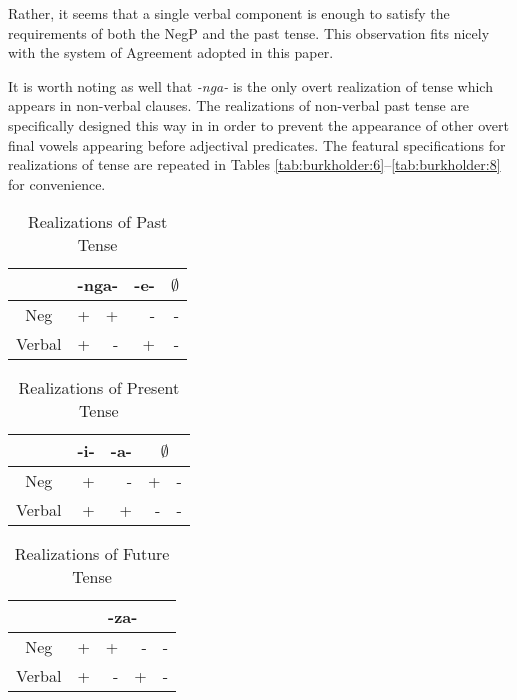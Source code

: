 \documentclass[output=paper]{langsci/langscibook}
\newcommand{\nga}[0]{\textit {-nga- }}
\begin{document}
{Rather, it seems that a single verbal component is enough to satisfy the requirements of both the NegP and the past tense. This observation fits nicely with the system of Agreement adopted in this paper.

It is worth noting as well that \nga is the only overt realization of tense which appears in non-verbal clauses. The realizations of non-verbal past tense are specifically designed this way in  in order to prevent the appearance of other overt final vowels appearing before adjectival predicates. The featural specifications for realizations of tense are repeated in Tables \ref{tab:burkholder:6}--\ref{tab:burkholder:8} for convenience. 


\begin{table}
\caption{Realizations of Past Tense} %
\centering %
\begin{tabular}{c| rr|r|r} %
\midrule%
 &\multicolumn{2}{c}{-nga-}& \multicolumn{1}{|c}{-e-}& \multicolumn{1}{|c}{$\emptyset$} \\ [0.5ex] 
\midrule%
Neg & + & + & - & -\\ %
Verbal & + & - & +& -\\[1ex] %
\midrule%
\end{tabular} 
\label{tab:hresult} 
\end{table} 





\begin{table}
\caption{Realizations of Present Tense} %
\centering %
\begin{tabular}{c| r|r|rr} %
\midrule%
 &\multicolumn{1}{c}{-i-}& \multicolumn{1}{|c|}{-a-}& \multicolumn{2}{|c}{$\emptyset$} \\ [0.5ex] 
\midrule%
Neg & + & - & + & -\\ %
Verbal & + & + & -& -\\[1ex] %
\midrule%
\end{tabular} 
\label{tab:hresult} 
\end{table} 



\begin{table}
\caption{Realizations of Future Tense} %
\centering %
\begin{tabular}{c| rrrr} %
\midrule%
 &\multicolumn{4}{c}{-za-} \\ [0.5ex] 
\midrule%
Neg & + & + & - & -\\ %
Verbal & + & - & +& -\\[1ex] %
\midrule%
\end{tabular} 
\label{tab:hresult} 
\end{table} 


}
\end{document}

